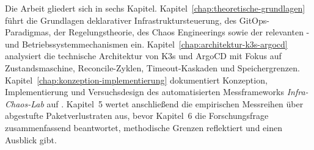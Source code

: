 Die Arbeit gliedert sich in sechs Kapitel. Kapitel~\ref{chap:theoretische-grundlagen} führt die Grundlagen deklarativer Infrastruktursteuerung, des GitOps-Paradigmas, der Regelungstheorie, des Chaos Engineerings sowie der relevanten - und Betriebssystemmechanismen ein. Kapitel~\ref{chap:architektur-k3s-argocd} analysiert die technische Architektur von K3s und ArgoCD mit Fokus auf Zustandsmaschine, Reconcile-Zyklen, Timeout-Kaskaden und Speichergrenzen. Kapitel~\ref{chap:konzeption-implementierung} dokumentiert Konzeption, Implementierung und Versuchsdesign des automatisierten Messframeworks \textit{Infra-Chaos-Lab} auf  . Kapitel~5 wertet anschließend die empirischen Messreihen über abgestufte Paketverlustraten aus, bevor Kapitel~6 die Forschungsfrage zusammenfassend beantwortet, methodische Grenzen reflektiert und einen Ausblick gibt.
